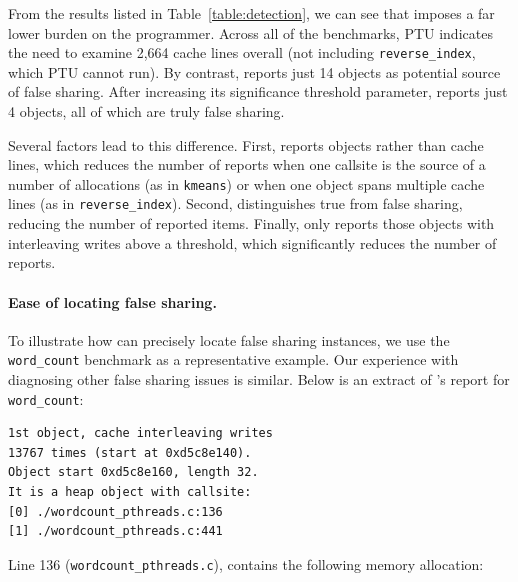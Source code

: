 From the results listed in Table~\ref{table:detection}, we can see
that \sheriffdetect{} imposes a far lower burden on the
programmer. Across all of the benchmarks, PTU indicates the need to
examine 2,664 cache lines overall (not
including \texttt{reverse\_index}, which PTU cannot run). By
contrast, \sheriffdetect{} reports just 14 objects as potential source
of false sharing.  After increasing its significance threshold
parameter,
\sheriffdetect{} reports just 4 objects, all of which are truly
false sharing.


Several factors lead to this difference.  
First, \sheriffdetect{} reports objects rather than cache lines, which reduces 
the number of reports when one callsite is the source of a number of
allocations (as in \texttt{kmeans}) 
or when one object spans multiple cache lines (as in \texttt{reverse\_index}).
Second, \sheriffdetect{} distinguishes true from false sharing, reducing the number of reported
items.  Finally, \sheriffdetect{} only reports those objects with
interleaving writes above a threshold, which
significantly reduces the number of reports. 



\paragraph{Ease of locating false sharing.}
To illustrate how \sheriffdetect{} can precisely locate false sharing instances, we 
use the \texttt{word\_count} benchmark as
a representative example. Our experience with diagnosing other false sharing issues is similar. Below is an extract of \sheriffdetect{}'s report for \texttt{word\_count}:

\begin{verbatim} 
1st object, cache interleaving writes 
13767 times (start at 0xd5c8e140). 
Object start 0xd5c8e160, length 32. 
It is a heap object with callsite:
[0] ./wordcount_pthreads.c:136
[1] ./wordcount_pthreads.c:441
\end{verbatim}

\noindent
Line 136 (\texttt{wordcount\_pthreads.c}), 
contains the following memory allocation:

